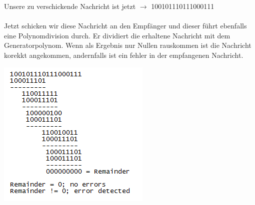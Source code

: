 \documentclass[a4paper,12pt]{scrartcl}
\begin{document}
Unsere zu verschickende Nachricht ist jetzt $\rightarrow$ 100101110111000111\\\\
Jetzt schicken wir diese Nachricht an den Empfänger und dieser führt ebenfalls eine Polynomdivision durch. Er dividiert die erhaltene Nachricht mit dem Generatorpolynom. Wenn als Ergebnis nur Nullen rauskommen ist die Nachricht korekkt angekommen, andernfalls ist ein fehler in der empfangenen Nachricht.\\
\begin{center}
\includegraphics{./images/Aufgabe8c-empfaenger}\\
\end{center}
\end{document}
